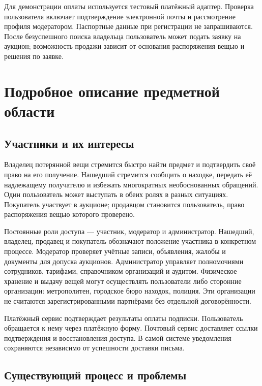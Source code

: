 Для демонстрации оплаты используется тестовый платёжный адаптер. Проверка пользователя включает подтверждение электронной почты и рассмотрение профиля модератором. Паспортные данные при регистрации не запрашиваются. После безуспешного поиска владельца пользователь может подать заявку на аукцион; возможность продажи зависит от основания распоряжения вещью и решения по заявке.

\clearpage
\section{Подробное описание предметной области}

\FloatBarrier
{}
\subsection{Участники и их интересы}

Владелец потерянной вещи стремится быстро найти предмет и подтвердить своё право на его получение. Нашедший стремится сообщить о находке, передать её надлежащему получателю и избежать многократных необоснованных обращений. Один пользователь может выступать в обеих ролях в разных ситуациях. Покупатель участвует в аукционе; продавцом становится пользователь, право распоряжения вещью которого проверено.

Постоянные роли доступа — участник, модератор и администратор. Нашедший, владелец, продавец и покупатель обозначают положение участника в конкретном процессе. Модератор проверяет учётные записи, объявления, жалобы и документы для допуска аукционов. Администратор управляет полномочиями сотрудников, тарифами, справочником организаций и аудитом. Физическое хранение и выдачу вещей могут осуществлять пользователи либо сторонние организации: метрополитен, городское бюро находок, полиция. Эти организации не считаются зарегистрированными партнёрами без отдельной договорённости.

Платёжный сервис подтверждает результаты оплаты подписки. Пользователь обращается к нему через платёжную форму. Почтовый сервис доставляет ссылки подтверждения и восстановления доступа. В самой системе уведомления сохраняются независимо от успешности доставки письма.

\FloatBarrier
{}
\subsection{Существующий процесс и проблемы}

